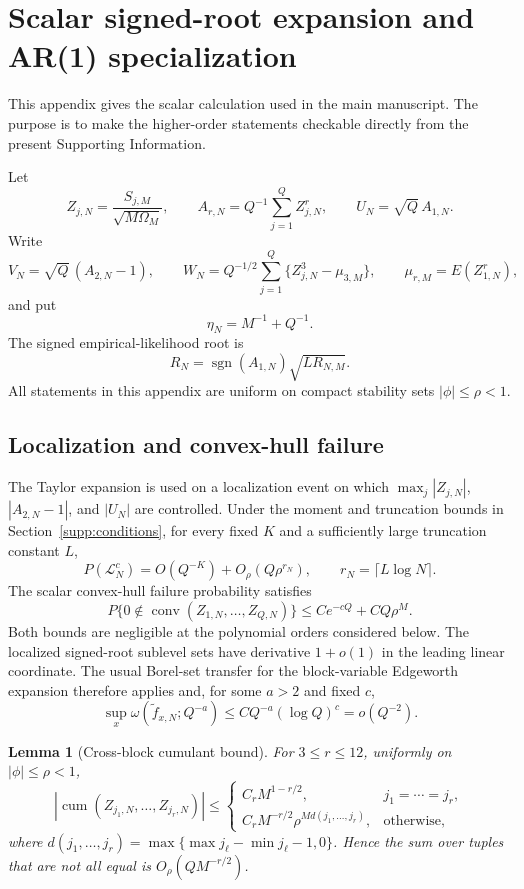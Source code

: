 \documentclass[12pt]{article}
\newtheorem{Lemma}[Proposition]{Lemma}
\theoremstyle{remark}
\begin{document}
\section{Scalar signed-root expansion and AR(1) specialization}
\label{supp:higher-order}
This appendix gives the scalar calculation used in the main manuscript. The purpose is to make the higher-order statements checkable directly from the present Supporting Information.

Let
\[
Z_{j,N}=\frac{S_{j,M}}{\sqrt{M\Omega_M}},
\qquad
A_{r,N}=Q^{-1}\sum_{j=1}^Q Z_{j,N}^r,
\qquad
U_N=\sqrt Q\,A_{1,N}.
\]
Write
\[
V_N=\sqrt Q\,(A_{2,N}-1),
\qquad
W_N=Q^{-1/2}\sum_{j=1}^Q\{Z_{j,N}^3-\mu_{3,M}\},
\qquad
\mu_{r,M}=E(Z_{1,N}^r),
\]
and put
\[
\eta_N=M^{-1}+Q^{-1}.
\]
The signed empirical-likelihood root is
\[
R_N=\operatorname{sgn}(A_{1,N})\sqrt{LR_{N,M}}.
\]
All statements in this appendix are uniform on compact stability sets $|\phi|\le\rho<1$.

\subsection{Localization and convex-hull failure}
\label{supp:localization}
The Taylor expansion is used on a localization event on which $\max_j|Z_{j,N}|$, $|A_{2,N}-1|$, and $|U_N|$ are controlled. Under the moment and truncation bounds in Section~\ref{supp:conditions}, for every fixed $K$ and a sufficiently large truncation constant $L$,
\begin{equation}
P(\mathcal L_N^c)=O(Q^{-K})+O_\rho(Q\rho^{r_N}),
\qquad r_N=\lceil L\log N\rceil.
\label{eq:supp-localization-prob}
\end{equation}
The scalar convex-hull failure probability satisfies
\begin{equation}
P\{0\notin\operatorname{conv}(Z_{1,N},\ldots,Z_{Q,N})\}
\le Ce^{-cQ}+CQ\rho^M.
\label{eq:supp-convex-hull-prob}
\end{equation}
Both bounds are negligible at the polynomial orders considered below. The localized signed-root sublevel sets have derivative $1+o(1)$ in the leading linear coordinate. The usual Borel-set transfer for the block-variable Edgeworth expansion therefore applies and, for some $a>2$ and fixed $c$,
\begin{equation}
\sup_x\omega(\widetilde f_{x,N};Q^{-a})
\le C Q^{-a}(\log Q)^c=o(Q^{-2}).
\label{eq:supp-boundary-modulus}
\end{equation}

\begin{Lemma}[Cross-block cumulant bound]
\label{lem:supp-cross-block-cumulants}
For $3\le r\le12$, uniformly on $|\phi|\le\rho<1$,
\[
|\operatorname{cum}(Z_{j_1,N},\ldots,Z_{j_r,N})|
\le
\begin{cases}
C_rM^{1-r/2},&j_1=\cdots=j_r,\\
C_rM^{-r/2}\rho^{M d(j_1,\ldots,j_r)},&\text{otherwise},
\end{cases}
\]
where $d(j_1,\ldots,j_r)=\max\{\max j_\ell-\min j_\ell-1,0\}$. Hence the sum over tuples that are not all equal is $O_\rho(QM^{-r/2})$.
\end{Lemma}
\end{document}
